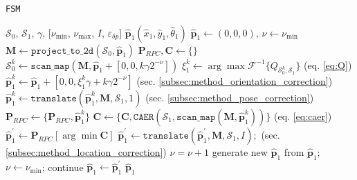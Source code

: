 \begin{algorithm}
  \caption{\texttt{FSM}}
  \begin{spacing}{1.2}
  \begin{algorithmic}[1]
    \REQUIRE $\mathcal{S}_0$, $\mathcal{S}_1$, $\gamma$, [$\nu_{\min}$, $\nu_{\max}$, $I$, $\varepsilon_{\delta p}$]
    \ENSURE $\hat{\bm{p}}_1(\hat{x}_1, \hat{y}_1, \hat{\theta}_1)$
    \STATE $\hat{\bm{p}}_1 \leftarrow (0,0,0)$, $\nu \leftarrow \nu_{\min}$
    \STATE $\bm{M} \leftarrow \texttt{project\_to\_2d}(\mathcal{S}_0, \hat{\bm{p}}_1)$
    \WHILE{$\nu \leq \nu_{\max}$}
      \STATE $\bm{P}_{RPC},  \bm{C} \leftarrow \{\}$
        \STATE $\mathcal{S}_0^k \leftarrow \texttt{scan\_map}(\bm{M}, \hat{\bm{p}}_1 + [0,0,k \gamma 2^{-\nu}])$
        \STATE $\xi_1^k \leftarrow \arg\max \mathcal{F}^{-1}\{Q_{\mathcal{S}_0^k, \mathcal{S}_1}\}$ \hfill (eq. \ref{eq:Q})
        \STATE $\hat{\bm{p}}_1^k \leftarrow \hat{\bm{p}}_1 + [0,0, \xi_1^k \gamma + k \gamma 2^{-\nu}]$ \hfill (sec. \ref{subsec:method_orientation_correction})
        \STATE $\hat{\bm{p}}_1^{k} \leftarrow \texttt{translate}(\hat{\bm{p}}_1^k, \bm{M}, \mathcal{S}_1, 1)$ \hfill (sec. \ref{subsec:method_pose_correction})
        \STATE $\bm{P}_{RPC} \leftarrow \{\bm{P}_{RPC}, \hat{\bm{p}}_1^{k}\}$
        \STATE $\bm{C} \leftarrow \{\bm{C}, \texttt{CAER}(\mathcal{S}_1,\texttt{scan\_map}(\bm{M},\hat{\bm{p}}_1^{k}))\}$ \hfill (eq. \ref{eq:caer})
      \ENDFOR
      \STATE $\hat{\bm{p}}_1^\prime \leftarrow \bm{P}_{RPC}[\arg\min \bm{C}]$
      \STATE $\hat{\bm{p}}_1^\prime \leftarrow \texttt{translate}(\hat{\bm{p}}_1^\prime, \bm{M}, \mathcal{S}_1, I);$  \hfill (sec. \ref{subsec:method_location_correction})
        \STATE $\nu = \nu + 1$
      \ENDIF
        \STATE generate new $\hat{\bm{p}}_1$ from $\hat{\bm{p}}_1$; $\nu \leftarrow \nu_{\min}$; continue
      \ENDIF
      \STATE $\hat{\bm{p}}_1 \leftarrow \hat{\bm{p}}_1^\prime$
    \ENDWHILE
    \RETURN $\hat{\bm{p}}_1$
  \end{algorithmic}
  \end{spacing}
  \label{alg:algorithm_fsm}
\end{algorithm}
